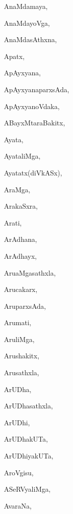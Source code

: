 \begin{multicols}{3}
{\noindent
{AnaMdamaya}, \pageref{AnaMdamaya}

\noindent
{AnaMdayoVga}, \pageref{AnaMdayoVga}

\noindent
{AnaMdasAthxna}, \pageref{AnaMdasAthxna}

\noindent
{Apatx}, \pageref{Apatx}

\noindent
{ApAyxyana}, \pageref{ApAyxyana}

\noindent
{ApAyxyanaparxsAda}, \pageref{ApAyxyanaparxsAda}

\noindent
{ApAyxyanoVdaka}, \pageref{ApAyxyanoVdaka}

\noindent
{ABayxMtaraBakitx}, \pageref{ABayxMtaraBakitx}

\noindent
{Ayata}, \pageref{Ayata}

\noindent
{AyataliMga}, \pageref{AyataliMga}

\noindent
{Ayatatx(diVkASx)}, \pageref{Ayatatx(diVkASx)}

\noindent
{AraMga}, \pageref{AraMga}

\noindent
{ArakaSxra}, \pageref{Ara(273)kaSxra}

\noindent
{Arati}, \pageref{Arati}

\noindent
{ArAdhana}, \pageref{ArAdhana}

\noindent
{ArAdhayx}, \pageref{ArAdhayx}

\noindent
{{Aru}aMgasathxla}, \pageref{Aru(273304)aMgasathxla}

\noindent
{Arucakarx}, \pageref{Arucakarx}

\noindent
{AruparxsAda}, \pageref{AruparxsAda}

\noindent
{Arumati}, \pageref{Arumati}

\noindent
{AruliMga}, \pageref{AruliMga}

\noindent
{Arushakitx}, \pageref{Aru(273304)shakitx}

\noindent
{Arusathxla}, \pageref{Arusathxla}

\noindent
{ArUDha}, \pageref{ArUDha}

\noindent
{ArUDhasathxla}, \pageref{ArUDhasathxla}

\noindent
{ArUDhi}, \pageref{ArUDhi}

\noindent
{ArUDhakUTa}, \pageref{ArUDhakUTa}

\noindent
{ArUDhiyakUTa}, \pageref{ArUDhiyakUTa}

\noindent
{AroVgisu}, \pageref{AroVgisu}

\noindent
{ASeRVyaliMga}, \pageref{ASeRVyaliMga}

\noindent
{AvaraNa}, \pageref{AvaraNa}

}
\end{multicols}
